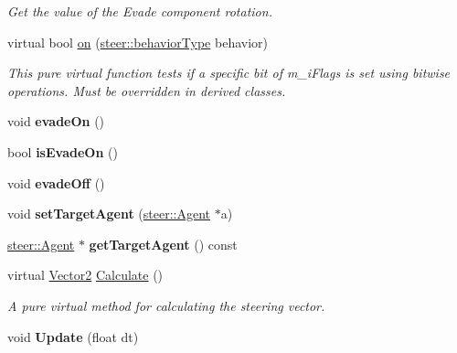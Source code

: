 \begin{DoxyCompactItemize}
\begin{DoxyCompactList}\small\item\em Get the value of the Evade component rotation. \end{DoxyCompactList}\item 
virtual bool \hyperlink{classsteer_1_1_evade_component_a7e71d5e7024ed7bce4624c831477f67b}{on} (\hyperlink{namespacesteer_afe6e72f8f8088962727051501181acbe}{steer\-::behavior\-Type} behavior)
\begin{DoxyCompactList}\small\item\em This pure virtual function tests if a specific bit of m\-\_\-i\-Flags is set using bitwise operations. Must be overridden in derived classes. \end{DoxyCompactList}\item 
\hypertarget{classsteer_1_1_evade_component_a9a2c4af52abc1eca52f43ff3a852be92}{void {\bfseries evade\-On} ()}\label{classsteer_1_1_evade_component_a9a2c4af52abc1eca52f43ff3a852be92}

\item 
\hypertarget{classsteer_1_1_evade_component_aa1d283de78d3327b9d711daf5303868b}{bool {\bfseries is\-Evade\-On} ()}\label{classsteer_1_1_evade_component_aa1d283de78d3327b9d711daf5303868b}

\item 
\hypertarget{classsteer_1_1_evade_component_aaa5e5db2dbc30c458042616ac8523c54}{void {\bfseries evade\-Off} ()}\label{classsteer_1_1_evade_component_aaa5e5db2dbc30c458042616ac8523c54}

\item 
\hypertarget{classsteer_1_1_evade_component_ac69216383eb27bd5841fc86fc08e0e77}{void {\bfseries set\-Target\-Agent} (\hyperlink{classsteer_1_1_agent}{steer\-::\-Agent} $\ast$a)}\label{classsteer_1_1_evade_component_ac69216383eb27bd5841fc86fc08e0e77}

\item 
\hypertarget{classsteer_1_1_evade_component_aca2324dcca0d3a1d9e435990c1adb299}{\hyperlink{classsteer_1_1_agent}{steer\-::\-Agent} $\ast$ {\bfseries get\-Target\-Agent} () const }\label{classsteer_1_1_evade_component_aca2324dcca0d3a1d9e435990c1adb299}

\item 
\hypertarget{classsteer_1_1_evade_component_a480a701424072758ba65458f1dfa5fe1}{virtual \hyperlink{structsteer_1_1_vector2}{Vector2} \hyperlink{classsteer_1_1_evade_component_a480a701424072758ba65458f1dfa5fe1}{Calculate} ()}\label{classsteer_1_1_evade_component_a480a701424072758ba65458f1dfa5fe1}

\begin{DoxyCompactList}\small\item\em A pure virtual method for calculating the steering vector. \end{DoxyCompactList}\item 
\hypertarget{classsteer_1_1_evade_component_a1a7516399d08da295f5132c016c4b300}{void {\bfseries Update} (float dt)}\label{classsteer_1_1_evade_component_a1a7516399d08da295f5132c016c4b300}

\end{DoxyCompactItemize}
